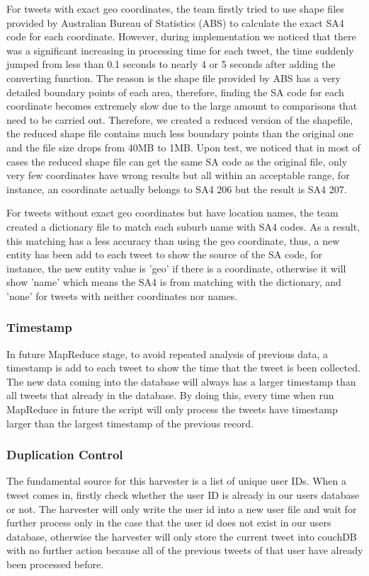 For tweets with exact geo coordinates, the team firstly tried to use shape files provided by Australian Bureau of Statistics (ABS) to calculate the exact SA4 code for each coordinate. However, during implementation we noticed that there was a significant increasing in processing time for each tweet, the time suddenly jumped from less than 0.1 seconds to nearly 4 or 5 seconds after adding the converting function. The reason is the shape file provided by ABS has a very detailed boundary points of each area, therefore, finding the SA code for each coordinate becomes extremely slow due to the large amount to comparisons that need to be carried out. Therefore, we created a reduced version of the shapefile, the reduced shape file contains much less boundary points than the original one and the file size drops from 40MB to 1MB. Upon test, we noticed that in most of cases the reduced shape file can get the same SA code as the original file, only very few coordinates have wrong results but all within an acceptable range, for instance, an coordinate actually belongs to SA4 206 but the result is SA4 207.

For tweets without exact geo coordinates but have location names, the team created a dictionary file to match each suburb name with SA4 codes. As a result, this matching has a less accuracy than using the geo coordinate, thus, a new entity has been add to each tweet to show the source of the SA code, for instance, the new entity value is 'geo' if there is a coordinate, otherwise it will show 'name' which means the SA4 is from matching with the dictionary, and 'none' for tweets with neither coordinates nor names.

\subsubsection{Timestamp}
In future MapReduce stage, to avoid repeated analysis of previous data, a timestamp is add to each tweet to show the time that the tweet is been collected. The new data coming into the database will always has a larger timestamp than all tweets that already in the database. By doing this, every time when run MapReduce in future the script will only process the tweets have timestamp larger than the largest timestamp of the previous record.
\subsubsection{Duplication Control}
The fundamental source for this harvester is a list of unique user IDs. When a tweet comes in, firstly check whether the user ID is already in our users database or not. The harvester will only write the user id into a new user file and wait for further process only in the case that the user id does not exist in our users database, otherwise the harvester will only store the current tweet into couchDB with no further action because all of the previous tweets of that user have already been processed before.

